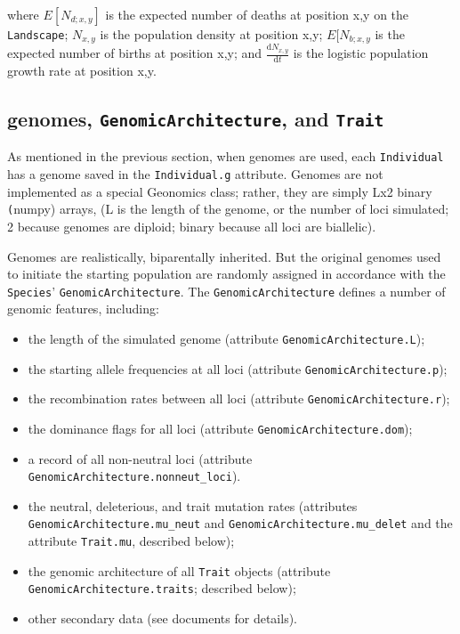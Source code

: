 ﻿\documentclass{article}
\begin{document}
where $E[N_{d;x,y}]$ is the expected number of deaths at position x,y on the
\texttt{Landscape}; $N_{x,y}$ is the population density at position x,y;
$E[N_{b;x,y}$ is the expected number of births at position x,y;
and $\frac{\mathrm{d}N_{x,y}}{\mathrm{d}t}$ is the
logistic population growth rate at position x,y.


\subsection{genomes, \texttt{GenomicArchitecture}, and \texttt{Trait}}
As mentioned in the previous section, when genomes are used, each \texttt{Individual} has
a genome saved in the \texttt{Individual.g} attribute. Genomes are not implemented
as a special Geonomics class; rather, they are simply Lx2 binary \texttt(numpy) arrays,
(L is the length of the genome, or the number of loci simulated; 2 because genomes
are diploid; binary because all loci are biallelic).

Genomes are realistically, biparentally inherited. But the original genomes used to
initiate the starting population are randomly assigned in accordance with the
\texttt{Species}' \texttt{GenomicArchitecture}. The \texttt{GenomicArchitecture} defines
a number of genomic features, including:
\begin{itemize}
        \item the length of the simulated genome (attribute \texttt{GenomicArchitecture.L});
        \item the starting allele frequencies at all loci (attribute \texttt{GenomicArchitecture.p});
        \item the recombination rates between all loci (attribute \texttt{GenomicArchitecture.r});
        \item the dominance flags for all loci (attribute \texttt{GenomicArchitecture.dom});
        \item a record of all non-neutral loci (attribute \texttt{GenomicArchitecture.nonneut\_loci}).
        \item the neutral, deleterious, and trait mutation rates (attributes \texttt{GenomicArchitecture.mu\_neut} and \texttt{GenomicArchitecture.mu\_delet} and the attribute \texttt{Trait.mu}, described below);
        \item the genomic architecture of all \texttt{Trait} objects (attribute \texttt{GenomicArchitecture.traits}; described below);
        \item other secondary data (see documents for details).
\end{itemize}
\end{document}
